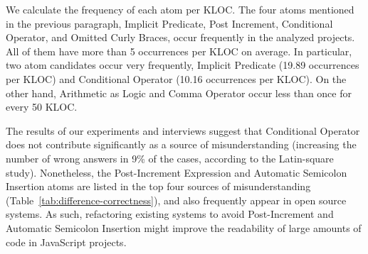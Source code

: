We calculate the frequency of each atom per KLOC.
The four atoms mentioned in the previous paragraph,
Implicit Predicate, Post Increment, Conditional Operator, and Omitted Curly Braces, occur frequently in the analyzed projects. All of them have more than 5 occurrences per KLOC on average. In particular, two atom candidates occur very frequently, Implicit Predicate (19.89 occurrences per KLOC) and Conditional Operator (10.16 occurrences per KLOC). On the other hand, Arithmetic as Logic and Comma Operator occur less than once for every 50 KLOC. 


The results of our experiments and interviews suggest that Conditional Operator does not contribute significantly as a source of misunderstanding (increasing the number of wrong answers in 9\% of the cases, according to the Latin-square study). Nonetheless, the Post-Increment Expression and Automatic Semicolon Insertion atoms are listed in the top four sources of misunderstanding  (Table~\ref{tab:difference-correctness}), and also frequently appear in open source systems. As such, refactoring existing systems to avoid Post-Increment and Automatic Semicolon Insertion might improve the readability of large amounts of code in JavaScript projects. 




 
